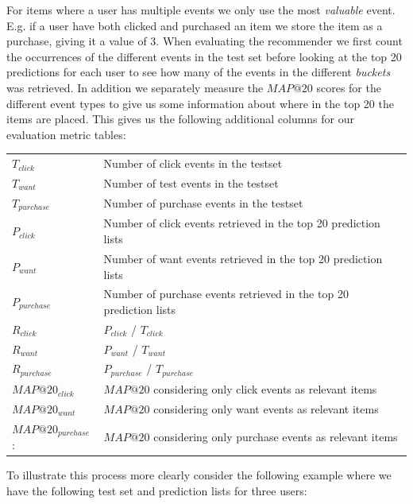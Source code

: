 For items where a user has multiple events we only use the most \emph{valuable} event. E.g. if a user have both clicked
and purchased an item we store the item as a purchase, giving it a value of 3. When evaluating the recommender we first count the
occurrences of the different events in the test set before looking at the top 20 predictions for each user to see how many of the events in the
different \emph{buckets} was retrieved. In addition we separately measure the $MAP@20$ scores for the different event types to give us some information
about where in the top 20 the items are placed. This gives us the following additional columns for our evaluation metric tables:

\begin{table}[H]
	\begin{tabular}{ll}
	\toprule
	$T_{click}$	 	 		& 	Number of click events in the testset \\
	$T_{want}$				&	Number of test events in the testset \\
	$T_{purchase}$	 		&	Number of purchase events in the testset \\
	$P_{click}$		 		&	Number of click events retrieved in the top 20 prediction lists \\
	$P_{want}$		 		&	Number of want events retrieved in the top 20 prediction lists \\
	$P_{purchase}$  		&	Number of purchase events retrieved in the top 20 prediction lists \\
	$R_{click}$				&	$P_{click}$ / $T_{click}$ \\
	$R_{want}$		 		&	$P_{want}$ / $T_{want}$  \\
	$R_{purchase}$	 		&	$P_{purchase}$ / $T_{purchase}$ \\
	$MAP@20_{click}$ 		&	$MAP@20$ considering only click events as relevant items \\
	$MAP@20_{want}$  		&	$MAP@20$ considering only want events as relevant items \\
	$MAP@20_{purchase}$: 	& 	$MAP@20$ considering only purchase events as relevant items \\
	\bottomrule
	\end{tabular}
\end{table}

To illustrate this process more clearly consider the following example where we have
the following test set and prediction lists for three users:

